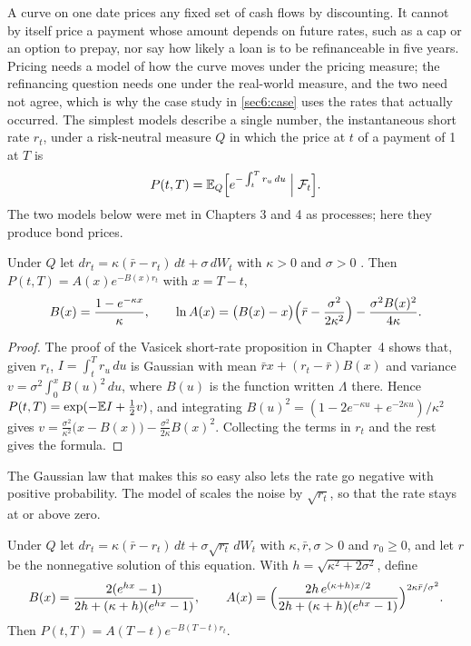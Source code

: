 \begin{chapterrefs}
A curve on one date prices any fixed set of cash flows by discounting. It cannot by itself price a payment whose amount depends on future rates, such as a cap or an option to
prepay, nor say how likely a loan is to be refinanceable in five years. Pricing needs a model of how the
curve moves under the pricing measure; the refinancing question needs one under the real-world measure,
and the two need not agree, which is why the case study in \cref{sec6:case} uses the rates that actually
occurred. The simplest models
describe a single number, the instantaneous short rate $r_t$, under a risk-neutral measure $Q$ in
which the price at $t$ of a payment of 1 at $T$ is
\begin{equation}\label{eq6:bond}
  P(t,T)=\mathbb{E}_Q\Bigl[e^{-\int_t^Tr_u\,du}\Bigm|\mathcal F_t\Bigr].
\end{equation}
The two models below were met in Chapters 3 and 4 as processes; here they produce bond prices.

\begin{proposition}\label{prop6:vasicek}
Under $Q$ let $dr_t=\kappa(\bar r-r_t)\,dt+\sigma\,dW_t$ with $\kappa>0$ and $\sigma>0$
\parencite{vasicek1977}. Then $P(t,T)=A(x)e^{-B(x)r_t}$ with $x=T-t$,
\[
  B(x)=\frac{1-e^{-\kappa x}}{\kappa},\qquad
  \ln A(x)=\bigl(B(x)-x\bigr)\Bigl(\bar r-\frac{\sigma^2}{2\kappa^2}\Bigr)-\frac{\sigma^2B(x)^2}{4\kappa}.
\]
\end{proposition}

\begin{proof}
The proof of the Vasicek short-rate proposition in Chapter~4 shows that, given $r_t$, $I=\int_t^Tr_u\,du$ is Gaussian with mean
$\bar rx+(r_t-\bar r)B(x)$ and variance $v=\sigma^2\int_0^xB(u)^2\,du$, where $B(u)$ is the function
written $\Lambda$ there. Hence $P(t,T)=\exp(-\mathbb{E} I+\tfrac12v)$, and integrating
$B(u)^2=(1-2e^{-\kappa u}+e^{-2\kappa u})/\kappa^2$ gives
$v=\tfrac{\sigma^2}{\kappa^2}\bigl(x-B(x)\bigr)-\tfrac{\sigma^2}{2\kappa}B(x)^2$. Collecting the terms
in $r_t$ and the rest gives the formula.
\end{proof}

The Gaussian law that makes this so easy also lets the rate go negative with positive probability.
The model of \textcite{cox1985} scales the noise by $\sqrt{r_t}$, so that the rate stays at or above
zero.

\begin{proposition}\label{prop6:cir}
Under $Q$ let $dr_t=\kappa(\bar r-r_t)\,dt+\sigma\sqrt{r_t}\,dW_t$ with $\kappa,\bar r,\sigma>0$ and
$r_0\ge0$, and let $r$ be the nonnegative solution of this equation. With
$h=\sqrt{\kappa^2+2\sigma^2}$, define
\[
  B(x)=\frac{2(e^{hx}-1)}{2h+(\kappa+h)(e^{hx}-1)},\qquad
  A(x)=\Bigl(\frac{2h\,e^{(\kappa+h)x/2}}{2h+(\kappa+h)(e^{hx}-1)}\Bigr)^{2\kappa\bar r/\sigma^2}.
\]
Then $P(t,T)=A(T-t)e^{-B(T-t)r_t}$.
\end{proposition}


\end{chapterrefs}
